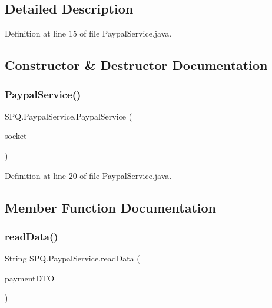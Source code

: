 \subsection{Detailed Description}


Definition at line 15 of file Paypal\+Service.\+java.



\subsection{Constructor \& Destructor Documentation}
\mbox{\label{class_s_p_q_1_1_paypal_service_a3cbaf105ed828689b48c82ec63527779}} 
\subsubsection{\texorpdfstring{Paypal\+Service()}{PaypalService()}}
{\footnotesize\ttfamily S\+P\+Q.\+Paypal\+Service.\+Paypal\+Service (\begin{DoxyParamCaption}\item[{Socket}]{socket }\end{DoxyParamCaption})}



Definition at line 20 of file Paypal\+Service.\+java.



\subsection{Member Function Documentation}
\mbox{\label{class_s_p_q_1_1_paypal_service_aae478af6069bf1ffa928b09f2a91328d}} 
\subsubsection{\texorpdfstring{read\+Data()}{readData()}}
{\footnotesize\ttfamily String S\+P\+Q.\+Paypal\+Service.\+read\+Data (\begin{DoxyParamCaption}\item[{\mbox{\hyperlink{class_s_p_q_1_1dto_1_1_payment_d_t_o}{Payment\+D\+TO}}}]{payment\+D\+TO }\end{DoxyParamCaption})}



